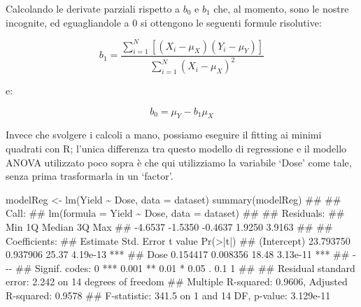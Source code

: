 \documentclass[a4paper,12pt,oneside]{book}
\newenvironment{Shaded}{\begin{snugshade}}{\end{snugshade}}
\newcommand{\SpecialCharTok}[1]{#1}
\newcommand{\DocumentationTok}[1]{#1}
\newcommand{\OtherTok}[1]{#1}
\newcommand{\FunctionTok}[1]{#1}
\newcommand{\AttributeTok}[1]{#1}
\newcommand{\NormalTok}[1]{#1}
\begin{document}
Calcolando le derivate parziali rispetto a \(b_0\) e \(b_1\) che, al momento, sono le nostre incognite, ed eguagliandole a 0 si ottengono le seguenti formule risolutive:

\[{b_1} = \frac{{\sum\limits_{i = 1}^N {\left[ {\left( {{X_i} - {\mu _X}} \right)\left( {{Y_i} - {\mu _Y}} \right)} \right]} }}{{\sum\limits_{i = 1}^N {{{\left( {{X_i} - {\mu _X}} \right)}^2}} }}\]

e:

\[{b_0} = {\mu _Y} - {b_1}{\mu _X}\]

Invece che svolgere i calcoli a mano, possiamo eseguire il fitting ai minimi quadrati con R; l'unica differenza tra questo modello di regressione e il modello ANOVA utilizzato poco sopra è che qui utilizziamo la variabile `Dose' come tale, senza prima trasformarla in un `factor'.

\begin{Shaded}
\begin{Highlighting}[]
\NormalTok{modelReg }\OtherTok{\textless{}{-}} \FunctionTok{lm}\NormalTok{(Yield }\SpecialCharTok{\textasciitilde{}}\NormalTok{ Dose, }\AttributeTok{data =}\NormalTok{ dataset)}
\FunctionTok{summary}\NormalTok{(modelReg)}
\DocumentationTok{\#\# }
\DocumentationTok{\#\# Call:}
\DocumentationTok{\#\# lm(formula = Yield \textasciitilde{} Dose, data = dataset)}
\DocumentationTok{\#\# }
\DocumentationTok{\#\# Residuals:}
\DocumentationTok{\#\#     Min      1Q  Median      3Q     Max }
\DocumentationTok{\#\# {-}4.6537 {-}1.5350 {-}0.4637  1.9250  3.9163 }
\DocumentationTok{\#\# }
\DocumentationTok{\#\# Coefficients:}
\DocumentationTok{\#\#              Estimate Std. Error t value Pr(\textgreater{}|t|)    }
\DocumentationTok{\#\# (Intercept) 23.793750   0.937906   25.37 4.19e{-}13 ***}
\DocumentationTok{\#\# Dose         0.154417   0.008356   18.48 3.13e{-}11 ***}
\DocumentationTok{\#\# {-}{-}{-}}
\DocumentationTok{\#\# Signif. codes:  0 \textquotesingle{}***\textquotesingle{} 0.001 \textquotesingle{}**\textquotesingle{} 0.01 \textquotesingle{}*\textquotesingle{} 0.05 \textquotesingle{}.\textquotesingle{} 0.1 \textquotesingle{} \textquotesingle{} 1}
\DocumentationTok{\#\# }
\DocumentationTok{\#\# Residual standard error: 2.242 on 14 degrees of freedom}
\DocumentationTok{\#\# Multiple R{-}squared:  0.9606, Adjusted R{-}squared:  0.9578 }
\DocumentationTok{\#\# F{-}statistic: 341.5 on 1 and 14 DF,  p{-}value: 3.129e{-}11}
\end{Highlighting}
\end{Shaded}
\end{document}
